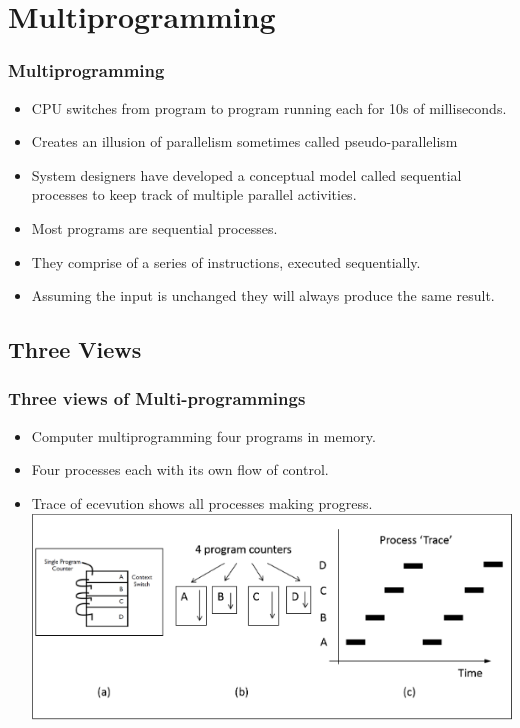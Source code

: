 \documentclass{beamer}
\begin{document}
\section{Multiprogramming}
\begin{frame}
\frametitle{Multiprogramming}
\begin{itemize}
\item CPU switches from program to program running each for 10s of milliseconds.
\item Creates an illusion of parallelism sometimes called pseudo-parallelism
\item System designers have developed a conceptual model called sequential processes to keep track of multiple parallel activities.
\item Most programs are sequential processes.
\item They comprise of a series of instructions, executed sequentially.
\item Assuming the input is unchanged they will always produce the same result.
\end{itemize}
\end{frame}
\subsection{Three Views}
\begin{frame}
\frametitle{Three views of Multi-programmings}
\begin{itemize}
\item Computer multiprogramming four programs in memory.
\item Four processes each with its own flow of control.
\item Trace of ecevution shows all processes making progress.
\includegraphics[scale=0.5]{three.png}
\end{itemize}
\end{frame}
\end{document}
